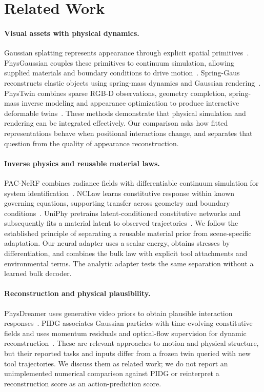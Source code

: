 \documentclass[10pt,twocolumn,letterpaper]{article}
\begin{document}
\section{Related Work}
\paragraph{Visual assets with physical dynamics.}
Gaussian splatting represents appearance through explicit spatial primitives~\cite{kerbl2023gaussians}. PhysGaussian couples these primitives to continuum simulation, allowing supplied materials and boundary conditions to drive motion~\cite{xie2024physgaussian}. Spring-Gaus reconstructs elastic objects using spring-mass dynamics and Gaussian rendering~\cite{zhong2024springgaus}. PhysTwin combines sparse RGB-D observations, geometry completion, spring-mass inverse modeling and appearance optimization to produce interactive deformable twins~\cite{jiang2025phystwin}. These methods demonstrate that physical simulation and rendering can be integrated effectively. Our comparison asks how fitted representations behave when positional interactions change, and separates that question from the quality of appearance reconstruction.

\paragraph{Inverse physics and reusable material laws.}
PAC-NeRF combines radiance fields with differentiable continuum simulation for system identification~\cite{li2023pacnerf}. NCLaw learns constitutive response within known governing equations, supporting transfer across geometry and boundary conditions~\cite{ma2023nclaw}. UniPhy pretrains latent-conditioned constitutive networks and subsequently fits a material latent to observed trajectories~\cite{mittal2025uniphy}. We follow the established principle of separating a reusable material prior from scene-specific adaptation. Our neural adapter uses a scalar energy, obtains stresses by differentiation, and combines the bulk law with explicit tool attachments and environmental terms. The analytic adapter tests the same separation without a learned bulk decoder.

\paragraph{Reconstruction and physical plausibility.}
PhysDreamer uses generative video priors to obtain plausible interaction responses~\cite{zhang2024physdreamer}. PIDG associates Gaussian particles with time-evolving constitutive fields and uses momentum residuals and optical-flow supervision for dynamic reconstruction~\cite{hong2026pidg}. These are relevant approaches to motion and physical structure, but their reported tasks and inputs differ from a frozen twin queried with new tool trajectories. We discuss them as related work; we do not report an unimplemented numerical comparison against PIDG or reinterpret a reconstruction score as an action-prediction score.
\end{document}
